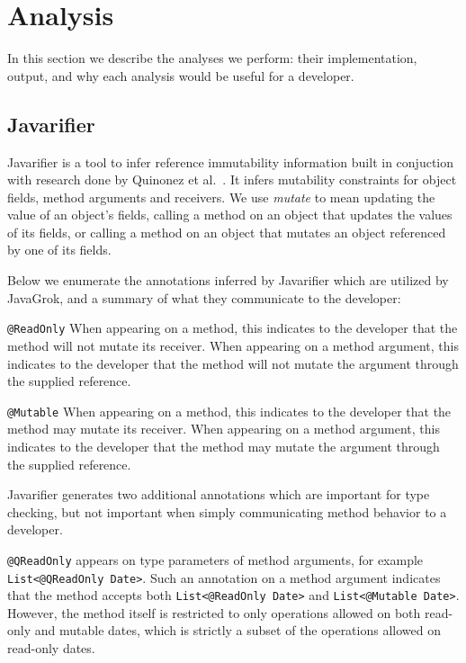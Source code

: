 \section{Analysis}

In this section we describe the analyses we perform: their implementation,
output, and why each analysis would be useful for a developer.

\subsection{Javarifier}
\label{sec:Javarifier}

Javarifier is a tool to infer reference immutability information built in
conjuction with research done by Quinonez et al.~\cite{Javarifier}. It infers
mutability constraints for object fields, method arguments and receivers.  We
use \textit{mutate} to mean updating the value of an object's fields, calling a
method on an object that updates the values of its fields, or calling a method
on an object that mutates an object referenced by one of its fields.

Below we enumerate the annotations inferred by Javarifier which are utilized by
JavaGrok, and a summary of what they communicate to the developer:

\texttt{@ReadOnly} When appearing on a method, this indicates to the developer
that the method will not mutate its receiver. When appearing on a method
argument, this indicates to the developer that the method will not mutate the
argument through the supplied reference.

\texttt{@Mutable} When appearing on a method, this indicates to the developer
that the method may mutate its receiver. When appearing on a method argument,
this indicates to the developer that the method may mutate the argument through
the supplied reference.

Javarifier generates two additional annotations which are important for type
checking, but not important when simply communicating method behavior to a
developer.

\texttt{@QReadOnly} appears on type parameters of method arguments, for example
\texttt{List<@QReadOnly Date>}. Such an annotation on a method argument
indicates that the method accepts both \texttt{List<@ReadOnly Date>} and
\texttt{List<@Mutable Date>}. However, the method itself is restricted to only
operations allowed on both read-only and mutable dates, which is strictly a
subset of the operations allowed on read-only dates.

